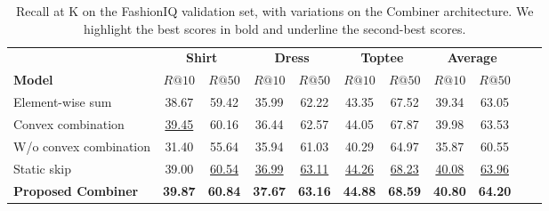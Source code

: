 \documentclass[acmlarge]{acmart}
\begin{document}
\begin{table}[tb]
\centering
\begin{tabular}{lcc  cc cc cc  cc}
\toprule

&\multicolumn{2}{c}{\textbf{Shirt}} & \multicolumn{2}{c}{\textbf{Dress}} & \multicolumn{2}{c}{\textbf{Toptee}} & \multicolumn{2}{c}{\textbf{Average}}\\
  \cmidrule(lr){2-3}
\cmidrule(lr){4-5}
  \cmidrule(lr){6-7}
  \cmidrule(lr){8-9}
\textbf{Model} & $R@10$ & $R@50$ &  $R@10$  & $R@50$ &  $R@10$  & $R@50$ &  $R@10$  & $R@50$  \\
\midrule
Element-wise sum  & 38.67 & 59.42 & 35.99 & 62.22 & 43.35 & 67.52 & 39.34 & 63.05\\ 
Convex combination & \underline{39.45} & 60.16 & 36.44 & 62.57 & 44.05 & 67.87 & 39.98 & 63.53 \\  W/o convex combination & 31.40 & 55.64 & 35.94 & 61.03 & 40.29 & 64.97 & 35.87 & 60.55\\
Static skip & 39.00 & \underline{60.54} & \underline{36.99} & \underline{63.11} & \underline{44.26} & \underline{68.23} & \underline{40.08} & \underline{63.96} \\ \textbf{Proposed Combiner} & \textbf{39.87} & \textbf{60.84} & \textbf{37.67} & \textbf{63.16} & \textbf{44.88} & \textbf{68.59} & \textbf{40.80} & \textbf{64.20}\\\bottomrule
\end{tabular}
\caption{Recall at K on the FashionIQ validation set, with variations on the Combiner architecture. We highlight the best scores in bold and underline the second-best scores.}
\label{tab:ablation_fashion_combiner}
\vspace{-4ex}
\end{table} 
\end{document}

